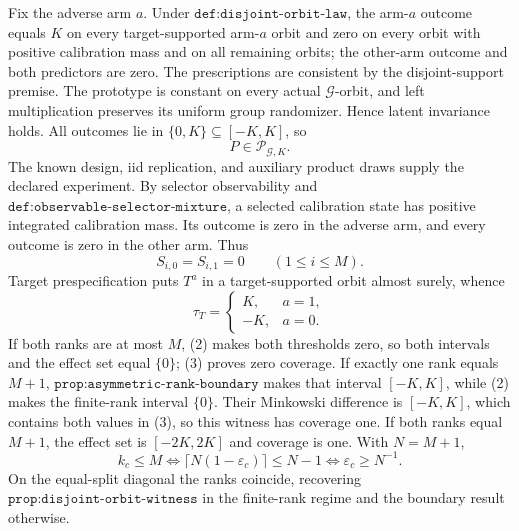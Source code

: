 Fix the adverse arm \(a\). Under \(\texttt{def:disjoint-orbit-law}\), the arm-\(a\) outcome equals \(K\) on every target-supported arm-\(a\) orbit and zero on every orbit with positive calibration mass and on all remaining orbits; the other-arm outcome and both predictors are zero. The prescriptions are consistent by the disjoint-support premise. The prototype is constant on every actual \(\mathcal G\)-orbit, and left multiplication preserves its uniform group randomizer. Hence latent invariance holds. All outcomes lie in \(\{0,K\}\subseteq[-K,K]\), so
\[
P\in\mathcal P_{\mathcal G,K}.
\tag{1}
\]
The known design, iid replication, and auxiliary product draws supply the declared experiment. By selector observability and \(\texttt{def:observable-selector-mixture}\), a selected calibration state has positive integrated calibration mass. Its outcome is zero in the adverse arm, and every outcome is zero in the other arm. Thus
\[
S_{i,0}=S_{i,1}=0\qquad(1\le i\le M).
\tag{2}
\]
Target prespecification puts \(T^a\) in a target-supported orbit almost surely, whence
\[
\tau_T=\begin{cases}K,&a=1,\\-K,&a=0.\end{cases}
\tag{3}
\]
If both ranks are at most \(M\), (2) makes both thresholds zero, so both intervals and the effect set equal \(\{0\}\); (3) proves zero coverage. If exactly one rank equals \(M+1\), \(\texttt{prop:asymmetric-rank-boundary}\) makes that interval \([-K,K]\), while (2) makes the finite-rank interval \(\{0\}\). Their Minkowski difference is \([-K,K]\), which contains both values in (3), so this witness has coverage one. If both ranks equal \(M+1\), the effect set is \([-2K,2K]\) and coverage is one. With \(N=M+1\),
\[
k_c\le M\iff \lceil N(1-\varepsilon_c)\rceil\le N-1\iff \varepsilon_c\ge N^{-1}.
\]
On the equal-split diagonal the ranks coincide, recovering \(\texttt{prop:disjoint-orbit-witness}\) in the finite-rank regime and the boundary result otherwise.